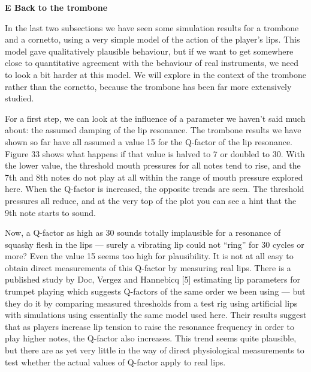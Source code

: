 

  \textbf{E Back to the trombone} 

  In the last two subsections we have seen some simulation results for a 
  trombone and a cornetto, using a very simple model of the action of the 
  player’s lips. This model gave qualitatively plausible behaviour, but if we 
  want to get somewhere close to quantitative agreement with the behaviour of 
  real instruments, we need to look a bit harder at this model. We will explore 
  in the context of the trombone rather than the cornetto, because the trombone 
  has been far more extensively studied. 

  For a first step, we can look at the influence of a parameter we haven’t said 
  much about: the assumed damping of the lip resonance. The trombone results we 
  have shown so far have all assumed a value 15 for the Q-factor of the lip 
  resonance. Figure 33 shows what happens if that value is halved to 7 or 
  doubled to 30. With the lower value, the threshold mouth pressures for all 
  notes tend to rise, and the 7th and 8th notes do not play at all within the 
  range of mouth pressure explored here. When the Q-factor is increased, the 
  opposite trends are seen. The threshold pressures all reduce, and at the very 
  top of the plot you can see a hint that the 9th note starts to sound. 



  Now, a Q-factor as high as 30 sounds totally implausible for a resonance of 
  squashy flesh in the lips --- surely a vibrating lip could not ``ring'' for 
  30 cycles or more? Even the value 15 seems too high for plausibility. It is 
  not at all easy to obtain direct measurements of this Q-factor by measuring 
  real lips. There is a published study by Doc, Vergez and Hannebicq [5] 
  estimating lip parameters for trumpet playing which suggests Q-factors of the 
  same order we been using — but they do it by comparing measured thresholds 
  from a test rig using artificial lips with simulations using essentially the 
  same model used here. Their results suggest that as players increase lip 
  tension to raise the resonance frequency in order to play higher notes, the 
  Q-factor also increases. This trend seems quite plausible, but there are as 
  yet very little in the way of direct physiological measurements to test 
  whether the actual values of Q-factor apply to real lips. 

